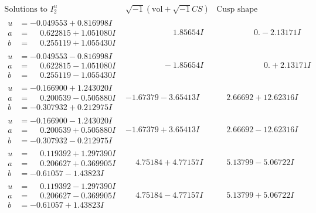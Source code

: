 \documentclass[1p]{elsarticle_modified}
\theoremstyle{definition}
\newcommand{\I}{\sqrt{-1}}
\begin{document}
$$\begin{array}{c|c|c}  
\text{Solutions to }I^u_{2}& \I (\text{vol} + \sqrt{-1}CS) & \text{Cusp shape}\\
 \hline 
\begin{aligned}
u &= -0.049553 + 0.816998 I \\
a &= \phantom{-}0.622815 + 1.051080 I \\
b &= \phantom{-}0.255119 + 1.055430 I\end{aligned}
 & \phantom{-0.000000 -}1.85654 I & \phantom{-0.000000 } 0. - 2.13171 I \\ \hline\begin{aligned}
u &= -0.049553 - 0.816998 I \\
a &= \phantom{-}0.622815 - 1.051080 I \\
b &= \phantom{-}0.255119 - 1.055430 I\end{aligned}
 & \phantom{-0.000000 } -1.85654 I & \phantom{-0.000000 -}0. + 2.13171 I \\ \hline\begin{aligned}
u &= -0.166900 + 1.243020 I \\
a &= \phantom{-}0.200539 - 0.505880 I \\
b &= -0.307932 + 0.212975 I\end{aligned}
 & -1.67379 - 3.65413 I & \phantom{-}2.66692 + 12.62316 I \\ \hline\begin{aligned}
u &= -0.166900 - 1.243020 I \\
a &= \phantom{-}0.200539 + 0.505880 I \\
b &= -0.307932 - 0.212975 I\end{aligned}
 & -1.67379 + 3.65413 I & \phantom{-}2.66692 - 12.62316 I \\ \hline\begin{aligned}
u &= \phantom{-}0.119392 + 1.297390 I \\
a &= \phantom{-}0.206627 + 0.369905 I \\
b &= -0.61057 - 1.43823 I\end{aligned}
 & \phantom{-}4.75184 + 4.77157 I & \phantom{-}5.13799 - 5.06722 I \\ \hline\begin{aligned}
u &= \phantom{-}0.119392 - 1.297390 I \\
a &= \phantom{-}0.206627 - 0.369905 I \\
b &= -0.61057 + 1.43823 I\end{aligned}
 & \phantom{-}4.75184 - 4.77157 I & \phantom{-}5.13799 + 5.06722 I \\ \hline\begin{aligned}

\end{aligned}
\end{array}$$
\end{document}
